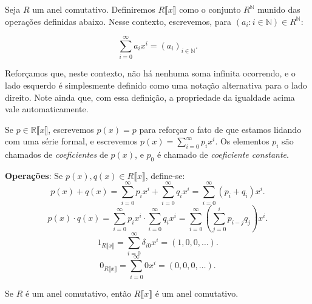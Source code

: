 \begin{definition}
Seja $R$ um anel comutativo.
Definiremos $R\llbracket x\rrbracket$ como o conjunto $R^{\mathbb N}$ munido das operações definidas abaixo.
Nesse contexto, escrevemos, para $(a_i: i \in \mathbb N)\in R^{\mathbb N}$:

\[\sum_{i=0}^\infty a_ix^i=(a_i)_{i \in \mathbb N}.\]

Reforçamos que, neste contexto, não há nenhuma soma infinita ocorrendo, e o lado esquerdo é simplesmente definido como uma notação alternativa para o lado direito.
Note ainda que, com essa definição, a propriedade da igualdade acima vale automaticamente.

Se $p\in \mathbb R\llbracket x\rrbracket$, escrevemos $p(x)=p$ para reforçar o fato de que estamos lidando com uma série formal, e escrevemos $p(x)=\sum_{i=0}^\infty p_ix^i$. Os elementos $p_i$ são chamados de \emph{coeficientes} de $p(x)$, e $p_0$ é chamado de \emph{coeficiente constante}.

\textbf{Operações}:
Se $p(x), q(x) \in R\llbracket x\rrbracket$, define-se:
\[p(x)+q(x)=\sum_{i=0}^\infty p_ix^i+\sum_{i=0}^\infty q_ix^i=\sum_{i=0}^\infty(p_i+q_i)x^i.\]
\[p(x)\cdot q(x)=\sum_{i=0}^\infty p_ix^i\cdot\sum_{i=0}^\infty q_ix^i=\sum_{i=0}^\infty\left(\sum_{j=0}^i p_{i-j}q_{j}\right)x^i.\]
\[1_{R\llbracket x\rrbracket}=\sum_{i=0}^\infty \delta_{i0}x^i=(1, 0, 0, \dots).\]
\[0_{R\llbracket x\rrbracket}=\sum_{i=0}^\infty 0x^i=(0, 0, 0, \dots).\]
\end{definition}

\begin{lemma}
    Se $R$ é um anel comutativo, então $R\llbracket x \rrbracket$ é um anel comutativo.
\end{lemma}

